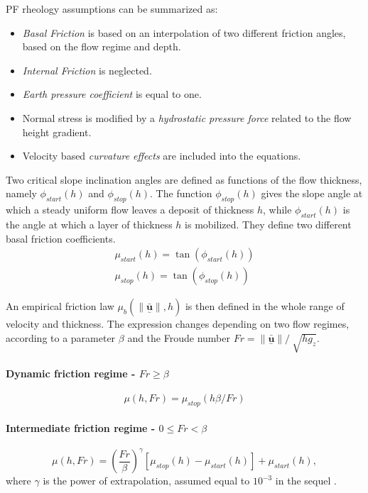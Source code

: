 \documentclass{article}
\begin{document}
PF rheology assumptions can be summarized as:
\begin{itemize}
\item \textit{Basal Friction} is based on an interpolation of two different friction angles, based on the flow regime and depth.

\item \textit{Internal Friction} is neglected.

\item \textit{Earth pressure coefficient} is equal to one.

\item Normal stress is modified by a \textit{hydrostatic pressure force} related to the flow height gradient.

\item Velocity based \textit{curvature effects} are included into the equations.
\end{itemize}

Two critical slope inclination angles are defined as functions of the flow thickness, namely $\phi_{start}(h)$ and $\phi_{stop}(h)$. The function $\phi_{stop}(h)$ gives the slope angle at which a steady uniform flow leaves a deposit of thickness $h$, while $\phi_{start}(h)$ is the angle at which a layer of thickness $h$ is mobilized. They define two different basal friction coefficients.
\begin{eqnarray}
\mu_{start}(h)=\tan(\phi_{start}(h))\\
\mu_{stop}(h)=\tan(\phi_{stop}(h))
\end{eqnarray}

An empirical friction law $\mu_{b}(\|\underset{^\sim}{\bar{\textbf{u}}} \| , h)$ is then defined in the whole range of velocity and thickness. The expression changes depending on two flow regimes, according to a parameter $\beta$ and the Froude number $Fr=\| \underset{^\sim}{\bar{\textbf{u}}} \| / \ \sqrt{h g_{z}}$.

\paragraph{Dynamic friction regime - $Fr \ge \beta$}
\begin{equation}\label{mu_beta1}
\mu(h, Fr)=\mu_{stop}(h \beta / Fr)
\end{equation}

\paragraph{Intermediate friction regime - $0 \le Fr < \beta$}
\begin{equation}\label{mu_beta2}
\mu(h, Fr)=\left(\frac{Fr}{\beta}\right)^\gamma [\mu_{stop}(h)-\mu_{start}(h)] + \mu_{start}(h),
\end{equation}
where $\gamma$ is the power of extrapolation, assumed equal to $10^{-3}$ in the sequel \citep{PouliquenForterre2002}.
\end{document}
